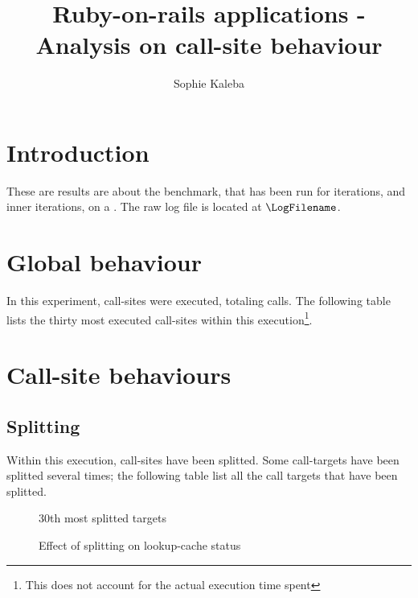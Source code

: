 \documentclass[preprint]{acmart}
\begin{document}
\title{Ruby-on-rails applications - Analysis on call-site behaviour}

\author{Sophie Kaleba}

\maketitle

\section{Introduction}

These are results are about the \BenchmarkName benchmark, that has been run for \NumIterations iterations, and \NumInnerIterations inner iterations, on a \Hihaho.
The raw log file is located at $\LogFilename$. 

\section{Global behaviour}

In this experiment, \NumberCallSites call-sites were executed, totaling \NumberCalls calls.  
The following table lists the thirty most executed call-sites within this execution\footnote{This does not account for the actual execution time spent}.

\MostExecutedCallSite

\section{Call-site behaviours}

\subsection{Splitting}

Within this execution, \NumOfSplittedTargets call-sites have been splitted.
Some call-targets have been splitted several times; the following table list all the call targets that have been splitted.

\newpage

\begin{figure}[h]
  \centering
  \Splitting
  \caption{
    30th most splitted targets}
\end{figure}

\begin{figure}[h]
  \centering
  \EffectSplitting
  \caption{
    Effect of splitting on lookup-cache status}
\end{figure}
\end{document}
